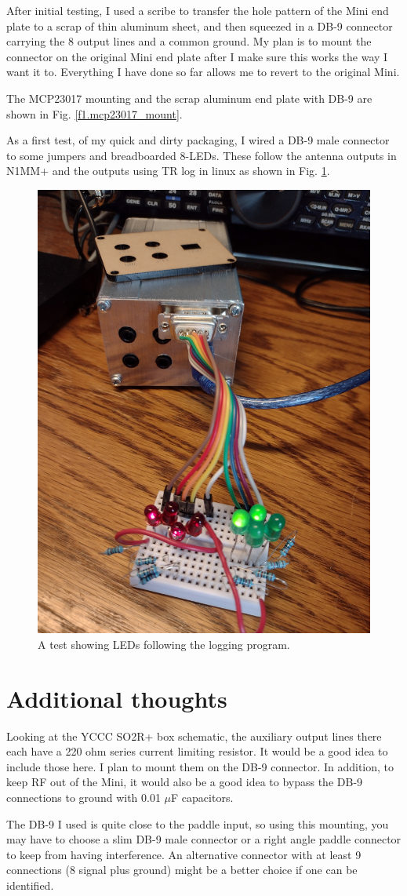 \documentclass[12pt]{article}
\begin{document}
After initial testing, I
used a scribe to transfer the hole pattern of the Mini
end plate to a scrap of thin aluminum sheet, and then squeezed in a DB-9
connector carrying the 8 output lines and a common ground. My plan is to
mount the connector on the original Mini end plate after I make sure this
works the way I want it to. Everything I have done so far allows me to
revert to the original Mini.

The MCP23017 mounting and the scrap aluminum end plate with
DB-9  are shown in
Fig. \ref{f1.mcp23017_mount}.

As a first test, of my quick and dirty packaging,
I wired a DB-9 male connector to some jumpers and
breadboarded 8-LEDs. These follow the antenna outputs in N1MM+ and
the outputs using TR log in linux as shown in Fig. \ref{f2.leds}.
\begin{figure}[htb]
\includegraphics[width=.5\textwidth]{led_test_1.jpg}
\caption{A test showing LEDs following the logging program.}
\label{f2.leds}
\end{figure}

\section{Additional thoughts}
Looking at the YCCC SO2R+ box schematic, the auxiliary output lines there
each have a 220 ohm series current limiting resistor. It would be a good
idea to include those here. I plan to mount them on the DB-9 connector.
In addition, to keep RF out of the Mini, it would also
be a good idea to bypass the DB-9 connections to ground
with 0.01 $\mu$F capacitors.

The DB-9 I used is quite close to the paddle input, so using this mounting,
you may have to choose a slim DB-9 male connector or a right angle
paddle connector to keep from having interference. An alternative connector
with at least 9 connections (8 signal plus ground)
might be a better choice if one can be identified.
\end{document}
